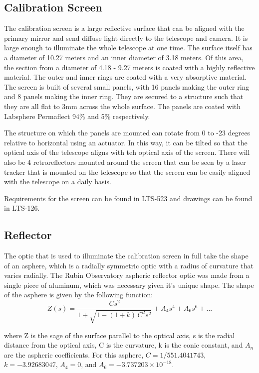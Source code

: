 \documentclass[SE,authoryear,toc]{article}
\begin{document}
\begin{table}[|||]
\subsection{Calibration Screen}
The calibration screen is a large reflective surface that can be aligned with the primary mirror and send diffuse light directly to the telescope and camera. It is large enough to illuminate the whole telescope at one time. The surface itself has a diameter of 10.27 meters and an inner diameter of 3.18 meters. Of this area, the section from a diameter of 4.18 - 9.27 meters is coated with a highly reflective material. The outer and inner rings are coated with a very absorptive material. The screen is built of several small panels, with 16 panels making the outer ring and 8 panels making the inner ring. They are secured to a structure such that they are all flat to 3mm across the whole surface. The panels are coated with Labsphere Permaflect 94\% and 5\% respectively. 

The structure on which the panels are mounted can rotate from 0 to -23 degrees relative to horizontal using an actuator. In this way, it can be tilted so that the optical axis of the telescope aligns with teh optical axis of the screen. There will also be 4 retroreflectors mounted around the screen that can be seen by a laser tracker that is mounted on the telescope so that the screen can be easily aligned with the telescope on a daily basis. 

Requirements for the screen can be found in LTS-523 and drawings can be found in LTS-126.

\subsection{Reflector}
The optic that is used to illuminate the calibration screen in full take the shape of an asphere, which is a radially symmetric optic with a radius of curvature that varies radially. The Rubin Observatory aspheric reflector optic was made from a single piece of aluminum, which was necessary given it's unique shape. The shape of the asphere is given by the following function:
\begin{equation}
Z(s) = \frac{C s^{2}}{1+\sqrt{1-(1+k)\,C^{2}s^{2}}} + A_{4}s^{4} + A_{6}s^{6} + ...
\end{equation}


where Z is the sage of the surface parallel to the optical axis, s is the radial distance from the optical axis, C is the curvature, k is the conic constant, and $A_{n}$ are the aspheric coefficients.
 For this asphere, $C=1/551.4041743$, $k=-3.92683047$, $A_{4}=0$, and $A_{6} = -3.737203\times10^{-18}$.


\end{table}
\end{document}
